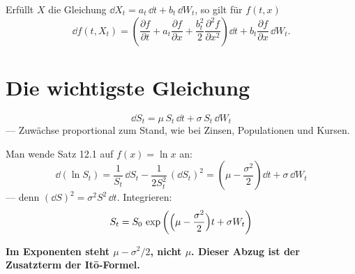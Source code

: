 \begin{merksatz}
Erfüllt $X$ die Gleichung $\dd X_t = a_t\,\dd t + b_t\,\dd W_t$, so gilt für $f(t,x)$
\[ \dd f(t,X_t) = \left(\frac{\partial f}{\partial t} + a_t\frac{\partial f}{\partial x} + \frac{b_t^{2}}{2}\frac{\partial^{2} f}{\partial x^{2}}\right)\dd t + b_t\frac{\partial f}{\partial x}\,\dd W_t . \]

\begin{center}
\begin{minipage}{0.88\textwidth}
\end{minipage}
\end{center}
\end{merksatz}

\section{Die wichtigste Gleichung}

\begin{merksatz}
\[ \dd S_t = \mu\,S_t\,\dd t + \sigma\,S_t\,\dd W_t \]
--- Zuwächse proportional zum Stand, wie bei Zinsen, Populationen und Kursen.

Man wende Satz 12.1 auf $f(x) = \ln x$ an:
\[ \dd(\ln S_t) = \frac{1}{S_t}\,\dd S_t - \frac{1}{2S_t^{2}}\,(\dd S_t)^{2} = \left(\mu - \frac{\sigma^{2}}{2}\right)\dd t + \sigma\,\dd W_t \]
--- denn $(\dd S)^{2} = \sigma^{2}S^{2}\,\dd t$. Integrieren:
\[ S_t = S_0\,\exp\left(\Bigl(\mu-\frac{\sigma^{2}}{2}\Bigr)t + \sigma W_t\right) \]

\begin{center}
\begin{minipage}{0.9\textwidth}
\textbf{Im Exponenten steht $\mu - \sigma^{2}/2$, nicht $\mu$. Dieser Abzug ist der Zusatzterm der Itō-Formel.}
\end{minipage}
\end{center}
\end{merksatz}

